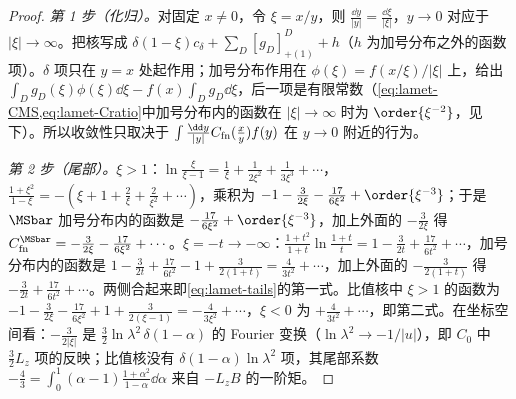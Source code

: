 \begin{proof}
\emph{第 1 步（化归）。}对固定 $x\neq0$，令 $\xi=x/y$，则 $\frac{\dd y}{|y|}=\frac{\dd\xi}{|\xi|}$，$y\to0$ 对应于 $|\xi|\to\infty$。把核写成 $\delta(1-\xi)c_\delta+\sum_D[g_D]^D_{+(1)}+h$（$h$ 为加号分布之外的函数项）。$\delta$ 项只在 $y=x$ 处起作用；加号分布作用在 $\phi(\xi)=f(x/\xi)/|\xi|$ 上，给出 $\int_Dg_D(\xi)\phi(\xi)\dd\xi-f(x)\int_Dg_D\dd\xi$，后一项是有限常数（\cref{eq:lamet-CMS,eq:lamet-Cratio}中加号分布内的函数在 $|\xi|\to\infty$ 时为 $\order{\xi^{-2}}$，见下）。所以收敛性只取决于 $\int\frac{\dd y}{|y|}C_{\rm fn}(\frac xy)f(y)$ 在 $y\to0$ 附近的行为。

\emph{第 2 步（尾部）。}$\xi>1$：$\ln\frac\xi{\xi-1}=\frac1\xi+\frac1{2\xi^2}+\frac1{3\xi^3}+\cdots$，$\frac{1+\xi^2}{1-\xi}=-(\xi+1+\frac2\xi+\frac2{\xi^2}+\cdots)$，乘积为 $-1-\frac3{2\xi}-\frac{17}{6\xi^2}+\order{\xi^{-3}}$；于是 $\MSbar$ 加号分布内的函数是 $-\frac{17}{6\xi^2}+\order{\xi^{-3}}$，加上外面的 $-\frac3{2\xi}$ 得 $C^{\MSbar}_{\rm fn}=-\frac3{2\xi}-\frac{17}{6\xi^2}+\cdots$。$\xi=-t\to-\infty$：$\frac{1+t^2}{1+t}\ln\frac{1+t}t=1-\frac3{2t}+\frac{17}{6t^2}+\cdots$，加号分布内的函数是 $1-\frac3{2t}+\frac{17}{6t^2}-1+\frac3{2(1+t)}=\frac4{3t^2}+\cdots$，加上外面的 $-\frac3{2(1+t)}$ 得 $-\frac3{2t}+\frac{17}{6t^2}+\cdots$。两侧合起来即\cref{eq:lamet-tails}的第一式。比值核中 $\xi>1$ 的函数为 $-1-\frac3{2\xi}-\frac{17}{6\xi^2}+1+\frac3{2(\xi-1)}=-\frac4{3\xi^2}+\cdots$，$\xi<0$ 为 $+\frac4{3t^2}+\cdots$，即第二式。在坐标空间看：$-\frac{3}{2|\xi|}$ 是 $\frac32\ln\lambda^2\,\delta(1-\alpha)$ 的 Fourier 变换（$\ln\lambda^2\to-1/|u|$），即 $C_0$ 中 $\frac32L_z$ 项的反映；比值核没有 $\delta(1-\alpha)\ln\lambda^2$ 项，其尾部系数 $-\frac43=\int_0^1(\alpha-1)\frac{1+\alpha^2}{1-\alpha}\dd\alpha$ 来自 $-L_zB$ 的一阶矩。


\end{proof}
